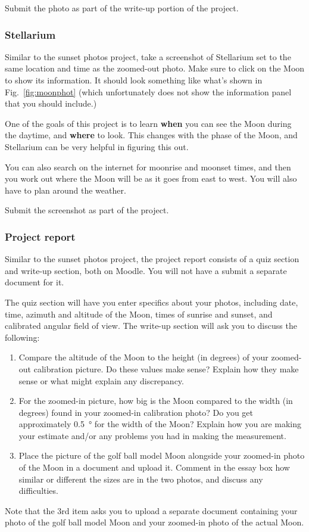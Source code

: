 \documentclass[main.tex]{subfiles}
\begin{document}
Submit the photo as part of the write-up portion of the project.

\subsubsection{Stellarium}
Similar to the sunset photos project, take a screenshot of Stellarium set to the same location and time as the zoomed-out photo. Make sure to click on the Moon to show its information. It should look something like what's shown in Fig.~\ref{fig:moonphot} (which unfortunately does not show the information panel that you should include.)

One of the goals of this project is to learn \textbf{when} you can see the Moon during the daytime, and \textbf{where} to look. This changes with the phase of the Moon, and Stellarium can be very helpful in figuring this out.

You can also search on the internet for moonrise and moonset times, and then you work out where the Moon will be as it goes from east to west. You will also have to plan around the weather.

Submit the screenshot as part of the project.

\subsubsection{Project report}
Similar to the sunset photos project, the project report consists of a quiz section and write-up section, both on Moodle. You will not have a submit a separate document for it.

The quiz section will have you enter specifics about your photos, including date, time, azimuth and altitude of the Moon, times of sunrise and sunset, and calibrated angular field of view. The write-up section will ask you to discuss the following:
\begin{enumerate}
\item Compare the altitude of the Moon to the height (in degrees) of your zoomed-out calibration picture. Do these values make sense? Explain how they make sense or what might explain any discrepancy.
\item For the zoomed-in picture, how big is the Moon compared to the width (in degrees) found in your zoomed-in calibration photo? Do you get approximately \SI{0.5}{\degree} for the width of the Moon? Explain how you are making your estimate and/or any problems you had in making the measurement.
\item Place the picture of the golf ball model Moon alongside your zoomed-in photo of the Moon in a document and upload it. Comment in the essay box how similar or different the sizes are in the two photos, and discuss any difficulties.
\end{enumerate}

Note that the 3rd item asks you to upload a separate document containing your photo of the golf ball model Moon and your zoomed-in photo of the actual Moon.
\end{document}
